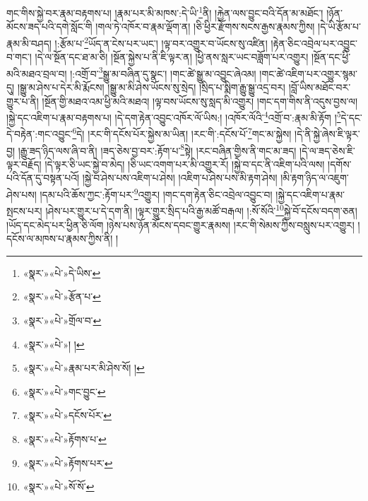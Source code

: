 གང་གིས་སྐྱེ་བར་རྣམ་བརྟགས་པ། །རྣམ་པར་མི་མཁས་:དེ་ཡི་\footnote{«སྣར་»«པེ་»དེ་ཡིས་}ནི། །རྐྱེན་ལས་བྱུང་བའི་དོན་མ་མཐོང་། །ཉོན་མོངས་ཟད་པའི་དགེ་སློང་གི །གལ་ཏེ་འཁོར་བ་རྣམ་ལྡོག་ན། །ཅི་ཕྱིར་རྫོགས་སངས་རྒྱས་རྣམས་ཀྱིས། །དེ་ཡི་རྩོམ་པ་རྣམ་མི་བཤད། །:རྩོམ་པ་\footnote{«སྣར་»«པེ་»རྩོན་པ་}ཡོད་ན་ངེས་པར་ཡང་། །ལྟ་བར་འགྱུར་བ་ཡོངས་སུ་འཛིན། །རྟེན་ཅིང་འབྲེལ་པར་འབྱུང་བ་གང་། །དེ་ལ་སྔོན་དང་ཐ་མ་ཅི། །སྔོན་སྐྱེས་པ་ནི་ཇི་ལྟར་ན། །ཕྱི་ནས་སླར་ཡང་བཟློག་པར་འགྱུར། །སྔོན་དང་ཕྱི་མའི་མཐའ་བྲལ་བ། །:འགྲོ་བ་\footnote{«སྣར་»«པེ་»གྲོལ་བ་}སྒྱུ་མ་བཞིན་དུ་སྣང་། །གང་ཚེ་སྒྱུ་མ་འབྱུང་ཞེའམ། །གང་ཚེ་འཇིག་པར་འགྱུར་སྙམ་དུ། །སྒྱུ་མ་ཤེས་པ་དེར་མི་རྨོངས། །སྒྱུ་མ་མི་ཤེས་ཡོངས་སུ་སྲེད། །སྲིད་པ་སྨིག་རྒྱུ་སྒྱུ་འདྲ་བར། །བློ་ཡིས་མཐོང་བར་གྱུར་པ་ནི། །སྔོན་གྱི་མཐའ་འམ་ཕྱི་མའི་མཐའ། །ལྟ་བས་ཡོངས་སུ་སླད་མི་འགྱུར། །གང་དག་གིས་ནི་འདུས་བྱས་ལ། །སྐྱེ་དང་འཇིག་པ་རྣམ་བརྟགས་པ། །དེ་དག་རྟེན་འབྱུང་འཁོར་ལོ་ཡིས:། །འཁོར་ལོའི་\footnote{«སྣར་»«པེ་»། །}འགྲོ་བ་:རྣམ་མི་རྟོག །\footnote{«སྣར་»«པེ་»རྣམ་པར་མི་ཤེས་སོ། །}དེ་དང་དེ་བརྟེན་:གང་འབྱུང་\footnote{«སྣར་»«པེ་»གང་བྱུང་}དེ། །རང་གི་དངོས་པོར་སྐྱེས་མ་ཡིན། །རང་གི་:དངོས་པོ་\footnote{«སྣར་»«པེ་»དངོས་པོར་}གང་མ་སྐྱེས། །དེ་ནི་སྐྱེ་ཞེས་ཇི་ལྟར་བྱ། །རྒྱུ་ཟད་ཉིད་ལས་ཞི་བ་ནི། །ཟད་ཅེས་བྱ་བར་:རྟོག་པ་\footnote{«སྣར་»«པེ་»རྟོགས་པ་}སྟེ། །རང་བཞིན་གྱིས་ནི་གང་མ་ཟད། །དེ་ལ་ཟད་ཅེས་ཇི་ལྟར་བརྗོད། །དེ་ལྟར་ཅི་ཡང་སྐྱེ་བ་མེད། །ཅི་ཡང་འགག་པར་མི་འགྱུར་རོ། །སྐྱེ་བ་དང་ནི་འཇིག་པའི་ལས། །དགོས་པའི་དོན་དུ་བསྟན་པའོ། །སྐྱེ་བ་ཤེས་པས་འཇིག་པ་ཤེས། །འཇིག་པ་ཤེས་པས་མི་རྟག་ཤེས། །མི་རྟག་ཉིད་ལ་འཇུག་ཤེས་པས། །དམ་པའི་ཆོས་ཀྱང་:རྟོག་པར་\footnote{«སྣར་»«པེ་»རྟོགས་པར་}འགྱུར། །གང་དག་རྟེན་ཅིང་འབྲེལ་འབྱུང་བ། །སྐྱེ་དང་འཇིག་པ་རྣམ་སྤངས་པར། །ཤེས་པར་གྱུར་པ་དེ་དག་ནི། །ལྟར་གྱུར་སྲིད་པའི་རྒྱ་མཚོ་བརྒལ། །:སོ་སོའི་\footnote{«སྣར་»«པེ་»སོ་སོ་}སྐྱེ་བོ་དངོས་བདག་ཅན། །ཡོད་དང་མེད་པར་ཕྱིན་ཅི་ལོག །ཉེས་པས་ཉོན་མོངས་དབང་གྱུར་རྣམས། །རང་གི་སེམས་ཀྱིས་བསླུས་པར་འགྱུར། །དངོས་ལ་མཁས་པ་རྣམས་ཀྱིས་ནི། །
